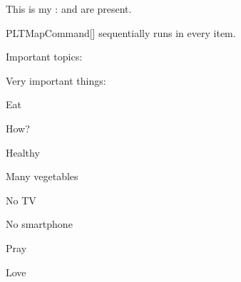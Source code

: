\documentclass[a4paper, 11pt]{article}
\begin{document}
\begin{tcblisting}{}

    This is my \PLTGetHeader:  and  are present.
\end{tcblisting}

\begin{macro}{PLTMapCommand}[]
     sequentially runs  in every item.
\end{macro}

\begin{tcblisting}{}
    Important topics: \PLTMapCommand{\showwithbullet}
\end{tcblisting}

\begin{tcblisting}{}

    \begin{importantlisting}
        Very important things:\par
        \item Eat%
        \begin{importantlisting}
            How?
            \item Healthy
            \item Many vegetables
            \item No TV
            \item No smartphone
        \end{importantlisting}
        \par
        \item Pray\par
        \item Love\par
    \end{importantlisting}
\end{tcblisting}
\end{document}
